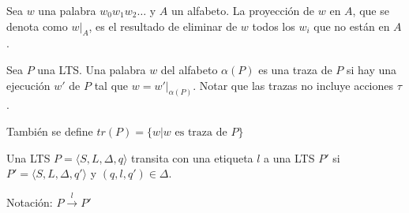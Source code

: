 \begin{definicion}[Proyecci\'on]
 Sea $w$ una palabra $w_0w_1w_2\dots$ y $A$ un alfabeto. La proyecci\'on de $w$ en $A$, que se denota como $w\lvert_A$, es el resultado de eliminar de $w$ todos los $w_i$ que no est\'an en $A$. 
\end{definicion}

\begin{definicion}[Trazas]
 Sea $P$ una LTS. Una palabra $w$ del alfabeto $\alpha(P)$ es una traza de $P$ si hay una ejecuci\'on $w'$ de $P$ tal que $w=w'\lvert_{\alpha(P)}$. Notar que las trazas no incluye acciones $\tau$. 
 
 Tambi\'en se define $tr(P) = \{w | w \text{ es traza de } P \}$
\end{definicion}

\begin{definicion}[Transitar]
 Una LTS $P=\langle S,L,\Delta,q\rangle$ transita con una etiqueta $l$ a una LTS $P'$ si $P'=\langle S,L,\Delta,q'\rangle$ y $(q,l,q') \in \Delta$.
 
 Notaci\'on: $P \overset{l}{\longrightarrow} P'$
\end{definicion}

